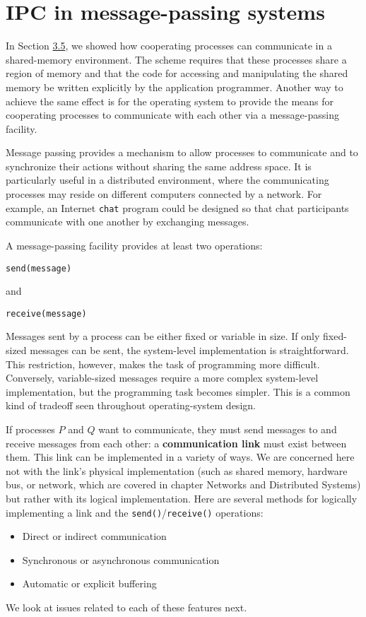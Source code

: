 \section{IPC in message-passing systems}\label{sec:3.6}

In Section \hyperref[sec:3.5]{3.5}, we showed how cooperating processes can communicate in a shared-memory environment. The scheme requires that these processes share a region of memory and that the code for accessing and manipulating the shared memory be written explicitly by the application programmer. Another way to achieve the same effect is for the operating system to provide the means for cooperating processes to communicate with each other via a message-passing facility.

Message passing provides a mechanism to allow processes to communicate and to synchronize their actions without sharing the same address space. It is particularly useful in a distributed environment, where the communicating processes may reside on different computers connected by a network. For example, an Internet \texttt{chat} program could be designed so that chat participants communicate with one another by exchanging messages.

A message-passing facility provides at least two operations:
\begin{verbatim}
send(message)
\end{verbatim}
and
\begin{verbatim}
receive(message)
\end{verbatim}
Messages sent by a process can be either fixed or variable in size. If only fixed-sized messages can be sent, the system-level implementation is straightforward. This restriction, however, makes the task of programming more difficult. Conversely, variable-sized messages require a more complex system-level implementation, but the programming task becomes simpler. This is a common kind of tradeoff seen throughout operating-system design.

If processes $P$ and $Q$ want to communicate, they must send messages to and receive messages from each other: a \textbf{communication link} must exist between them. This link can be implemented in a variety of ways. We are concerned here not with the link's physical implementation (such as shared memory, hardware bus, or network, which are covered in chapter Networks and Distributed Systems) but rather with its logical implementation. Here are several methods for logically implementing a link and the \texttt{send()}/\texttt{receive()} operations:
\begin{itemize}
\item Direct or indirect communication
\item Synchronous or asynchronous communication
\item Automatic or explicit buffering
\end{itemize}
We look at issues related to each of these features next.

